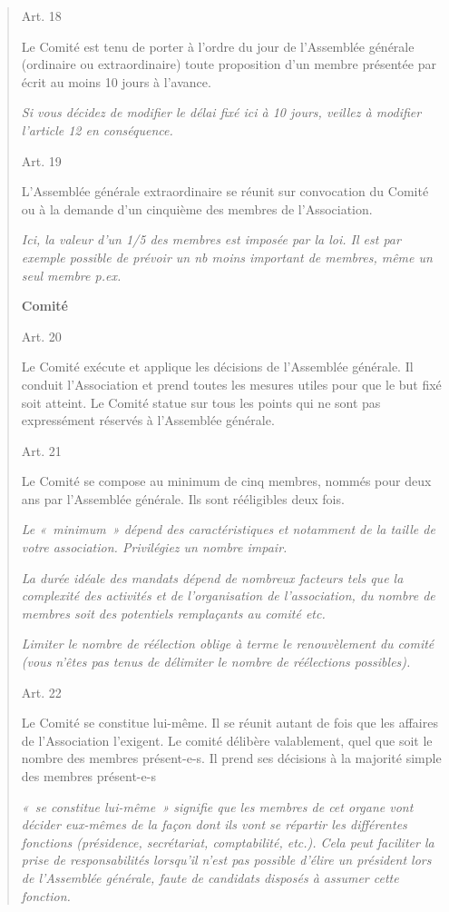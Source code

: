\documentclass[
]{article}
\begin{document}
\begin{quote}
Art. 18

Le Comité est tenu de porter à l'ordre du jour de l'Assemblée générale
(ordinaire ou extraordinaire) toute proposition d'un membre présentée
par écrit au moins 10 jours à l'avance.

\emph{Si vous décidez de modifier le délai fixé ici à 10 jours, veillez
à modifier l'article 12 en conséquence.}

Art. 19

L'Assemblée générale extraordinaire se réunit sur convocation du Comité
ou à la demande d'un cinquième des membres de l'Association.

\emph{Ici, la valeur d'un 1/5 des membres est imposée par la loi. Il est
par exemple possible de prévoir un nb moins important de membres, même
un seul membre p.ex.}

\textbf{Comité}

Art. 20

Le Comité exécute et applique les décisions de l'Assemblée générale. Il
conduit l'Association et prend toutes les mesures utiles pour que le but
fixé soit atteint. Le Comité statue sur tous les points qui ne sont pas
expressément réservés à l'Assemblée générale.

Art. 21

Le Comité se compose au minimum de cinq membres, nommés pour deux ans
par l'Assemblée générale. Ils sont rééligibles deux fois.

\emph{Le «~minimum~» dépend des caractéristiques et notamment de la
taille de votre association. Privilégiez un nombre impair.}

\emph{La durée idéale des mandats dépend de nombreux facteurs tels que
la complexité des activités et de l'organisation de l'association, du
nombre de membres soit des potentiels remplaçants au comité etc.}

\emph{Limiter le nombre de réélection oblige à terme le renouvèlement du
comité (vous n'êtes pas tenus de délimiter le nombre de réélections
possibles).}

Art. 22

Le Comité se constitue lui-même. Il se réunit autant de fois que les
affaires de l'Association l'exigent. Le comité délibère valablement,
quel que soit le nombre des membres présent-e-s. Il prend ses décisions
à la majorité simple des membres présent-e-s

\emph{«~se constitue lui-même~» signifie que les membres de cet organe
vont décider eux-mêmes de la façon dont ils vont se répartir les
différentes fonctions (présidence, secrétariat, comptabilité, etc.).
Cela peut faciliter la prise de responsabilités lorsqu'il n'est pas
possible d'élire un président lors de l'Assemblée générale, faute de
candidats disposés à assumer cette fonction.}


\end{quote}
\end{document}
